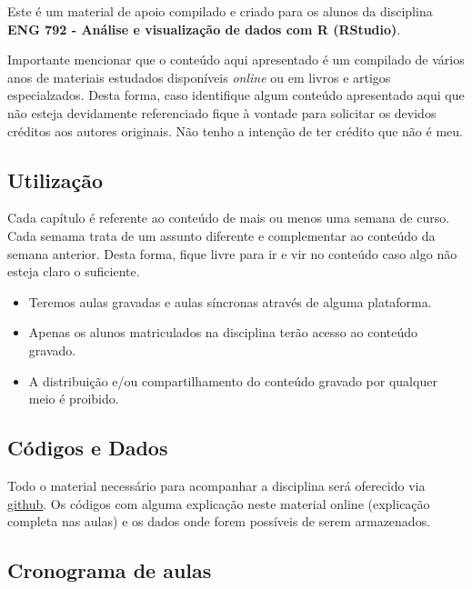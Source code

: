 \documentclass[
]{book}
\providecommand{\tightlist}{%
  \setlength{\itemsep}{0pt}\setlength{\parskip}{0pt}}
\begin{document}
Este é um material de apoio compilado e criado para os alunos da disciplina \textbf{ENG 792 - Análise e visualização de dados com R (RStudio)}.

Importante mencionar que o conteúdo aqui apresentado é um compilado de vários anos de materiais estudados disponíveis \emph{online} ou em livros e artigos especialzados. Desta forma, caso identifique algum conteúdo apresentado aqui que não esteja devidamente referenciado fique à vontade para solicitar os devidos créditos aos autores originais. Não tenho a intenção de ter crédito que não é meu.

\hypertarget{utilizauxe7uxe3o}{%
\subsection{Utilização}\label{utilizauxe7uxe3o}}

Cada capítulo é referente ao conteúdo de mais ou menos uma semana de curso. Cada semama trata de um assunto diferente e complementar ao conteúdo da semana anterior.
Desta forma, fique livre para ir e vir no conteúdo caso algo não esteja claro o suficiente.

\begin{itemize}
\tightlist
\item
  Teremos aulas gravadas e aulas síncronas através de alguma plataforma.\\
\item
  Apenas os alunos matriculados na disciplina terão acesso ao conteúdo gravado.\\
\item
  A distribuição e/ou compartilhamento do conteúdo gravado por qualquer meio é proibido.
\end{itemize}

\hypertarget{cuxf3digos-e-dados}{%
\subsection{Códigos e Dados}\label{cuxf3digos-e-dados}}

Todo o material necessário para acompanhar a disciplina será oferecido via \href{https://github.com/Jacksonmrod/ENG-792}{github}. Os códigos com alguma explicação neste material online (explicação completa nas aulas) e os dados onde forem possíveis de serem armazenados.

\hypertarget{cronograma-de-aulas}{%
\subsection{Cronograma de aulas}\label{cronograma-de-aulas}}
\end{document}
